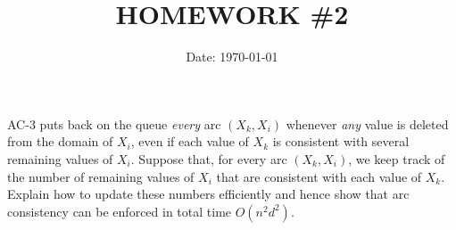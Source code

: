 \documentclass[cn,12pt]{homework}
\title{HOMEWORK \#2} %
\date{Date: \today} %
\institute{ZHEJIANG UNIVERSITY\quad COLLEGE OF INFORMATION SCIENCE AND ELECTRONICS ENGINEERING} %
\begin{document}
\maketitle



\begin{problem}

AC-3 puts back on the queue \textit{every} arc $(X_k, X_i)$ whenever \textit{any} value is deleted from the domain of $X_i$, even if each value of $X_k$ is consistent with several remaining values of $X_i$. Suppose that, for every arc $(X_k, X_i)$, we keep track of the number of remaining values of $X_i$ that are consistent with each value of $X_k$. Explain how to update these numbers efficiently and hence show that arc consistency can be enforced in total time $O(n^2d^2)$.
\end{problem}
\end{document}
